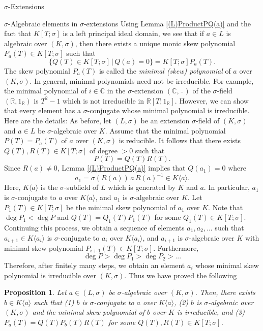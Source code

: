 \documentclass[11pt,a4paper]{article}
\theoremstyle{theorem}
\newtheorem{proposition}[theorem]{Proposition}
\numberwithin{equation}{section}
\newcommand{\s}{\sigma}
\begin{document}
\begin{section}{$\s$-Extensions}
\begin{subsection}{$\s$-Algebraic elements in $\s$-extensions }
	Using Lemma \ref{(L)ProductPQ(a)} and the fact that $K[T;\sigma]$ is a left principal ideal domain, we see that  if $a\in L$ is algebraic over $(K,\s)$, then there exists a unique  monic skew polynomial $P_a(T)\in K[T;\sigma]$ such that
	$$\{Q(T)\in K[T;\sigma]\,|\, Q(a)=0 \}=K[T;\sigma]P_a(T).$$
	The skew polynomial $P_a(T)$ is called the \textit{minimal (skew) polynomial} of $a$ over $(K,\sigma)$. 
	In general, minimal polynomials need not be irreducible. For example, the minimal polynomial of $i\in\mathbb{C}$ in the $\s$-extension  $(\mathbb{C},\,\bar\, \,)$ of the  $\s$-field $(\mathbb{R},1_\mathbb{R})$ is $T^2 -1$ which is not irreducible in $\mathbb{R}[T;1_\mathbb{R}]$. However, we can show that every element has a $\s$-conjugate whose minimal polynomial is irreducible. Here are the details:  
	As before, let $(L,\s)$ be an extension $\sigma$-field  of $(K,\sigma)$ and $a\in L$ be $\s$-algebraic over $K$. Assume that the minimal polynomial $P(T)=P_a(T)$ of $a$ over $(K,\s)$ is reducible. It follows that there exists $Q(T),R(T)\in K[T;\sigma]$ of degree $>0$ such that 
	$$P(T)=Q(T)R(T).$$
	Since $R(a)\neq 0$, Lemma \ref{(L)ProductPQ(a)} implies that $Q(a_1)=0$ where 
	$$a_1=\sigma(R(a))\, a\, R(a)^{-1}\in K\langle a \rangle.$$ 
	Here, $K\langle a \rangle$ is the $\s$-subfield of $L$ which is generated by $K$ and $a$. In particular, $a_1$ is $\sigma$-conjugate to $a$ over $K\langle a \rangle$, and $a_1$ is $\s$-algebraic over $K$. Let $P_1(T)\in K[T;\sigma]$  be the minimal  skew polynomial of $a_1$ over $K$. Note that $\deg P_1<\deg P$ and $Q(T)=Q_1(T)P_1(T)$ for some $Q_1(T)\in K[T;\sigma]$. Continuing this process, we obtain a sequence of elements $a_1,a_2,...$ such that $a_{i+1}\in K\langle a_i \rangle$ is $\s$-conjugate to $a_i$ over $K\langle a_i \rangle$, and  $a_{i+1}$ is $\s$-algebraic over $K$ with minimal skew polynomial $P_{i+1}(T)\in  K[T;\sigma]$. Furthermore, 
	$$\deg P>\deg P_1> \deg P_2>...$$
	Therefore, after finitely many steps, we obtain an element $a_i$ whose minimal skew polynomial is irreducible over $(K,\s)$. Thus we have proved the following   
	\begin{proposition}
		Let $a\in (L,\s)$ be $\s$-algebraic over $(K,\s)$. Then, there exists $b\in  K\langle a\rangle$ such that (1) $b$ is $\sigma$-conjugate to $a$ over $K\langle a \rangle$, (2) $b$ is $\s$-algebraic over $(K,\s)$ and the minimal skew polynomial of $b$ over $K$ is irreducible, and (3) $P_a(T)=Q(T)P_b(T)R(T)$ for some $Q(T),R(T)\in K[T;\sigma]$.
	\end{proposition}	


\end{subsection}
\end{section}
\end{document}

